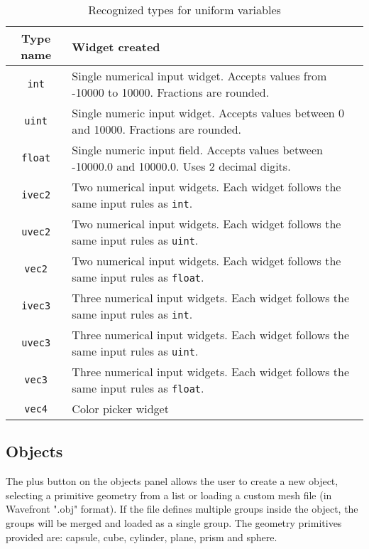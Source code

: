 \begin{table}
    \centering
    \caption{Recognized types for uniform variables}
    \begin{tabular}{|c|p{10cm}|}
        \hline
        Type name & Widget created \\
        \hline \hline
        \texttt{int} & Single numerical input widget. Accepts values from -10000 to 10000. Fractions are rounded. \\ \hline
        \texttt{uint} & Single numeric input widget. Accepts values between 0 and 10000. Fractions are rounded. \\ \hline
        \texttt{float} & Single numeric input field. Accepts values between -10000.0 and 10000.0. Uses 2 decimal digits. \\ \hline
        \texttt{ivec2} & Two numerical input widgets. Each widget follows the same input rules as \texttt{int}. \\ \hline
        \texttt{uvec2} & Two numerical input widgets. Each widget follows the same input rules as \texttt{uint}. \\ \hline
        \texttt{vec2} & Two numerical input widgets. Each widget follows the same input rules as \texttt{float}. \\ \hline
        \texttt{ivec3} & Three numerical input widgets. Each widget follows the same input rules as \texttt{int}. \\ \hline
        \texttt{uvec3} & Three numerical input widgets. Each widget follows the same input rules as \texttt{uint}. \\ \hline
        \texttt{vec3} & Three numerical input widgets. Each widget follows the same input rules as \texttt{float}. \\ \hline
        \texttt{vec4} & Color picker widget \\
        \hline
    \end{tabular}
    \label{tab:uniform_types}
\end{table}

\subsection{Objects}

The plus button on the objects panel allows the user to create a new object, selecting a primitive geometry from a list or loading a custom mesh file (in Wavefront ".obj" format). If the file defines multiple groups inside the object, the groups will be merged and loaded as a single group. The geometry primitives provided are: capsule, cube, cylinder, plane, prism and sphere.

